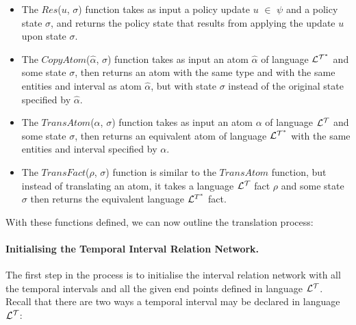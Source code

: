 \documentclass[11pt]{report}
\begin{document}
          \begin{itemize}

            \item
              The $Res$($u$, $\sigma$) function takes as input a policy update
              $u$ $\in$ $\psi$ and a policy state $\sigma$, and returns the
              policy state that results from applying the update $u$ upon
              state $\sigma$.

            \item
              The $CopyAtom$($\hat{\alpha}$, $\sigma$) function takes as input
              an atom $\hat{\alpha}$ of language ${\cal L^{T^*}}$ and some
              state $\sigma$, then returns an atom with the same type and with
              the same entities and interval as atom $\hat{\alpha}$, but with
              state $\sigma$ instead of the original state specified by
              $\hat{\alpha}$.

            \item
              The $TransAtom$($\alpha$, $\sigma$) function takes as input an
              atom $\alpha$ of language ${\cal L^T}$ and some state $\sigma$,
              then returns an equivalent atom of language ${\cal L^{T^*}}$
              with the same entities and interval specified by $\alpha$.

            \item
              The $TransFact$($\rho$, $\sigma$) function is similar to the
              $TransAtom$ function, but instead of translating an atom, it
              takes a language ${\cal L^T}$ fact $\rho$ and some state $\sigma$
              then returns the equivalent language ${\cal L}^{T^*}$ fact.
          \end{itemize}

          With these functions defined, we can now outline the translation
          process:

          \paragraph
            {\bf Initialising the Temporal Interval Relation Network.}

            The first step in the process is to initialise the interval
            relation network with all the temporal intervals and all the
            given end points defined in language ${\cal L^T}$. Recall that
            there are two ways a temporal interval may be declared in
            language ${\cal L^T}$:
\end{document}
